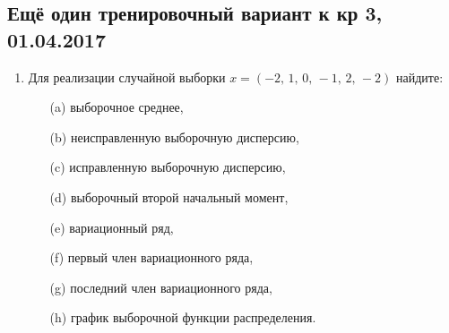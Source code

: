 \documentclass[12pt, a4paper]{article}\usepackage[]{graphicx}\usepackage[]{color}
\begin{document}
						\subsection{Ещё один тренировочный вариант к кр 3, 01.04.2017}

						\begin{enumerate}
							\item  Для реализации случайной выборки $x = (-2, \, 1, \, 0, \, -1, \, 2, \, -2)$ найдите:
							\begin{itemize}
								\item[(a)] выборочное среднее,
								\item[(b)] неисправленную выборочную дисперсию,
								\item[(c)] исправленную выборочную дисперсию,
								\item[(d)] выборочный второй начальный момент,
								\item[(e)] вариационный ряд,
								\item[(f)] первый член вариационного ряда,
								\item[(g)] последний член вариационного ряда,
								\item[(h)] график выборочной функции распределения.
							\end{itemize}



\end{enumerate}
\end{document}

